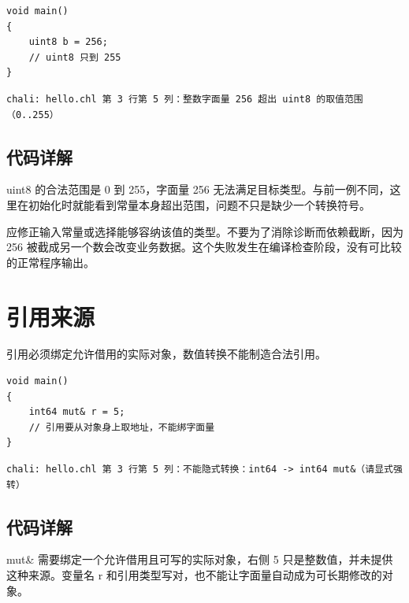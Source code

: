 \par
\medskip
\begin{lstlisting}[style=chali]
void main()
{
    uint8 b = 256;
    // uint8 只到 255
}
\end{lstlisting}
\par
\medskip

\par
\medskip
\begin{lstlisting}[style=out]
chali: hello.chl 第 3 行第 5 列：整数字面量 256 超出 uint8 的取值范围（0..255）
\end{lstlisting}
\par
\medskip

\subsection*{代码详解}

uint8 的合法范围是 0 到 255，字面量 256 无法满足目标类型。与前一例不同，这里在初始化时就能看到常量本身超出范围，问题不只是缺少一个转换符号。

应修正输入常量或选择能够容纳该值的类型。不要为了消除诊断而依赖截断，因为 256 被截成另一个数会改变业务数据。这个失败发生在编译检查阶段，没有可比较的正常程序输出。

\section{引用来源}

引用必须绑定允许借用的实际对象，数值转换不能制造合法引用。

\par
\medskip
\begin{lstlisting}[style=chali]
void main()
{
    int64 mut& r = 5;
    // 引用要从对象身上取地址，不能绑字面量
}
\end{lstlisting}
\par
\medskip

\par
\medskip
\begin{lstlisting}[style=out]
chali: hello.chl 第 3 行第 5 列：不能隐式转换：int64 -> int64 mut&（请显式强转）
\end{lstlisting}
\par
\medskip

\subsection*{代码详解}

mut\& 需要绑定一个允许借用且可写的实际对象，右侧 5 只是整数值，并未提供这种来源。变量名 r 和引用类型写对，也不能让字面量自动成为可长期修改的对象。

